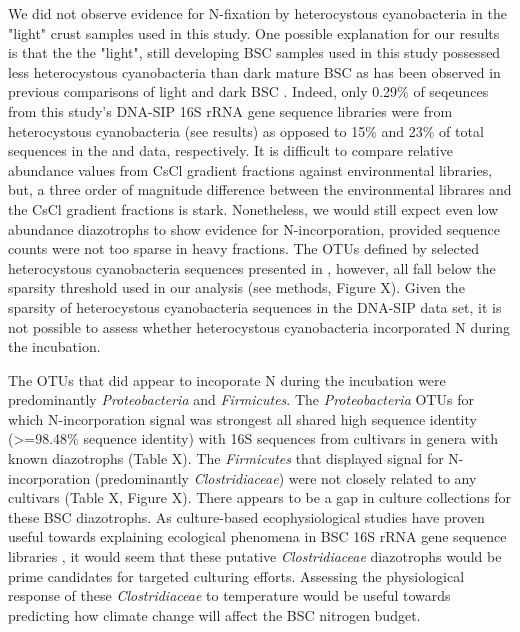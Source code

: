 We did not observe evidence for N-fixation by heterocystous cyanobacteria in the "light" crust samples used in this study. One possible explanation for our results is that the the "light", still developing BSC samples used in this study possessed less heterocystous cyanobacteria than dark mature BSC as has been observed in previous comparisons of light and dark BSC \cite{14766579}. Indeed, only 0.29\% of seqeunces from this study's DNA-SIP 16S rRNA gene sequence libraries were from heterocystous cyanobacteria (see results) as opposed to 15\% and 23\% of total sequences in the \citet{Steven_2013} and \citet{Garcia_Pichel_2013} data, respectively. It is difficult to compare relative abundance values from CsCl gradient fractions against environmental libraries, but, a three order of magnitude difference between the environmental librares and the CsCl gradient fractions is stark. Nonetheless, we would still expect even low abundance diazotrophs to show evidence for N-incorporation, provided sequence counts were not too sparse in heavy fractions. The OTUs defined by selected heterocystous cyanobacteria sequences presented in \citet{Yeager}, however, all fall below the sparsity threshold used in our analysis (see methods, Figure X). Given the sparsity of heterocystous cyanobacteria sequences in the DNA-SIP data set, it is not possible to assess whether heterocystous cyanobacteria incorporated N during the incubation.

The OTUs that did appear to incoporate N during the incubation were predominantly \textit{Proteobacteria} and \textit{Firmicutes}. The \textit{Proteobacteria} OTUs for which N-incorporation signal was strongest all shared high sequence identity (\textgreater=98.48\% sequence identity) with 16S sequences from cultivars in genera with known diazotrophs (Table X). The \textit{Firmicutes} that displayed signal for N-incorporation (predominantly \textit{Clostridiaceae}) were not closely related to any cultivars (Table X, Figure X). There appears to be a gap in culture collections for these BSC diazotrophs. As culture-based ecophysiological studies have proven useful towards explaining ecological phenomena in BSC 16S rRNA gene sequence libraries \cite{Garcia_Pichel_2013}, it would seem that these putative \textit{Clostridiaceae} diazotrophs would be prime candidates for targeted culturing efforts. Assessing the physiological response of these \textit{Clostridiaceae} to temperature would be useful towards predicting how climate change will affect the BSC nitrogen budget. 


